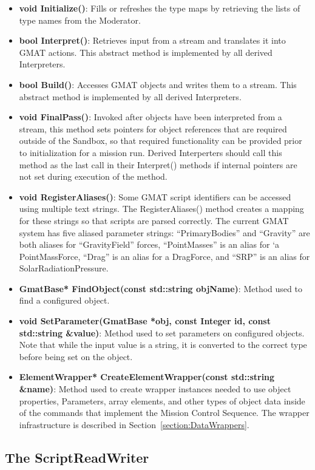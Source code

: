 \begin{itemize}
\item \textbf{void Initialize()}: Fills or refreshes the type maps by retrieving the lists of type
names from the Moderator.
\item \textbf{bool Interpret()}: Retrieves input from a stream and translates it into GMAT actions.
 This abstract method is implemented by all derived Interpreters.
\item \textbf{bool Build()}: Accesses GMAT objects and writes them to a stream. This abstract method
is implemented by all derived Interpreters.
\item \textbf{void FinalPass()}: Invoked after objects have been interpreted from a stream, this
method sets pointers for object references that are required outside of the Sandbox, so that
required functionality can be provided prior to initialization for a mission run.  Derived
Interperters should call this method as the last call in their Interpret() methods if internal
pointers are not set during execution of the method.
\item \textbf{void RegisterAliases()}: Some GMAT script identifiers can be accessed using multiple
text strings.  The RegisterAliases() method creates a mapping for these strings so that scripts are
parsed correctly.  The current GMAT system has five aliased parameter strings: ``PrimaryBodies''
and ``Gravity'' are both aliases for ``GravityField'' forces, ``PointMasses'' is an alias for `a
PointMassForce, ``Drag'' is an alias for a DragForce, and ``SRP'' is an alias for
SolarRadiationPressure.
\item \textbf{GmatBase* FindObject(const std::string objName)}: Method used to find a configured
object.
\item \textbf{void SetParameter(GmatBase *obj, const Integer id, const std::string \&value)}:
Method used to set parameters on configured objects.  Note that while the input value is a string,
it is converted to the correct type before being set on the object.
\item \textbf{\label{method:CreateElementWrapper}ElementWrapper* CreateElementWrapper(const
std::string \&name)}: Method used to create wrapper instances needed to use object properties,
Parameters, array elements, and other types of object data inside of the commands that implement the
Mission Control Sequence. The wrapper infrastructure is described in
Section~\ref{section:DataWrappers}.
\end{itemize}

\subsection{\label{section:ScriptReadWriter}The ScriptReadWriter}

